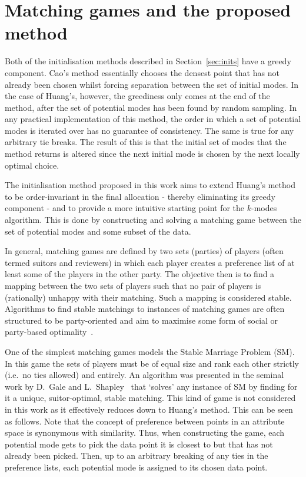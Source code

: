 \section{Matching games and the proposed method}\label{sec:method}

Both of the initialisation methods described in Section~\ref{sec:inits} have a
greedy component. Cao's method essentially chooses the densest point that has
not already been chosen whilst forcing separation between the set of initial
modes. In the case of Huang's, however, the greediness only comes at the end
of the method, after the set of potential modes has been found by random
sampling.  In any practical implementation of this method, the order in which a
set of potential modes is iterated over has no guarantee of consistency. The
same is true for any arbitrary tie breaks. The result of this is that the
initial set of modes that the method returns is altered since the next initial
mode is chosen by the next locally optimal choice.

The initialisation method proposed in this work aims to extend Huang's method to
be order-invariant in the final allocation \-- thereby eliminating its greedy
component \-- and to provide a more intuitive starting point for the \(k\)-modes
algorithm. This is done by constructing and solving a matching game between the
set of potential modes and some subset of the data.

In general, matching games are defined by two sets (parties) of players (often
termed suitors and reviewers) in which each player creates a preference list of
at least some of the players in the other party. The objective then is to find a
mapping between the two sets of players such that no pair of players is
(rationally) unhappy with their matching. Such a mapping is considered stable.
Algorithms to find stable matchings to instances of matching games are often
structured to be party-oriented and aim to maximise some form of social or
party-based optimality~\cite{Fuku2006,Gale1962,Kwanashie2015}.

One of the simplest matching games models the Stable Marriage Problem (SM). In
this game the sets of players must be of equal size and rank each other strictly
(i.e.\ no ties allowed) and entirely. An algorithm was presented in the seminal
work by D.\ Gale and L.\ Shapley~\cite{Gale1962} that `solves' any instance of
SM by finding for it a unique, suitor-optimal, stable matching. This kind of
game is not considered in this work as it effectively reduces down to Huang's
method. This can be seen as follows. Note that the concept of preference between
points in an attribute space is synonymous with similarity. Thus, when
constructing the game, each potential mode gets to pick the data point it is
closest to but that has not already been picked. Then, up to an arbitrary
breaking of any ties in the preference lists, each potential mode is assigned to
its chosen data point.

